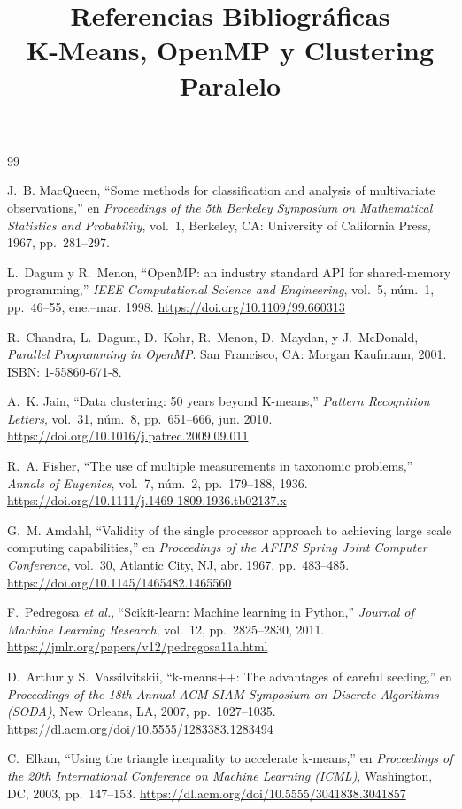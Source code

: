 \documentclass[12pt]{article}
\title{Referencias Bibliogr\'aficas\\
       \large K-Means, OpenMP y Clustering Paralelo}
\author{}
\date{}
\begin{document}
\maketitle

\begin{thebibliography}{99}

J.~B. MacQueen,
``Some methods for classification and analysis of multivariate observations,''
en \textit{Proceedings of the 5th Berkeley Symposium on Mathematical
Statistics and Probability}, vol.~1,
Berkeley, CA: University of California Press, 1967, pp.~281--297.

L.~Dagum y R.~Menon,
``OpenMP: an industry standard API for shared-memory programming,''
\textit{IEEE Computational Science and Engineering},
vol.~5, n\'um.~1, pp.~46--55, ene.--mar. 1998.
\url{https://doi.org/10.1109/99.660313}

R.~Chandra, L.~Dagum, D.~Kohr, R.~Menon, D.~Maydan, y J.~McDonald,
\textit{Parallel Programming in OpenMP}.
San Francisco, CA: Morgan Kaufmann, 2001.
ISBN: 1-55860-671-8.

A.~K. Jain,
``Data clustering: 50 years beyond K-means,''
\textit{Pattern Recognition Letters},
vol.~31, n\'um.~8, pp.~651--666, jun. 2010.
\url{https://doi.org/10.1016/j.patrec.2009.09.011}

R.~A. Fisher,
``The use of multiple measurements in taxonomic problems,''
\textit{Annals of Eugenics},
vol.~7, n\'um.~2, pp.~179--188, 1936.
\url{https://doi.org/10.1111/j.1469-1809.1936.tb02137.x}

G.~M. Amdahl,
``Validity of the single processor approach to achieving large scale
computing capabilities,''
en \textit{Proceedings of the AFIPS Spring Joint Computer Conference},
vol.~30, Atlantic City, NJ, abr. 1967, pp.~483--485.
\url{https://doi.org/10.1145/1465482.1465560}

F.~Pedregosa \textit{et al.},
``Scikit-learn: Machine learning in Python,''
\textit{Journal of Machine Learning Research},
vol.~12, pp.~2825--2830, 2011.
\url{https://jmlr.org/papers/v12/pedregosa11a.html}

D.~Arthur y S.~Vassilvitskii,
``k-means++: The advantages of careful seeding,''
en \textit{Proceedings of the 18th Annual ACM-SIAM Symposium on Discrete
Algorithms (SODA)},
New Orleans, LA, 2007, pp.~1027--1035.
\url{https://dl.acm.org/doi/10.5555/1283383.1283494}

C.~Elkan,
``Using the triangle inequality to accelerate k-means,''
en \textit{Proceedings of the 20th International Conference on Machine
Learning (ICML)},
Washington, DC, 2003, pp.~147--153.
\url{https://dl.acm.org/doi/10.5555/3041838.3041857}

\end{thebibliography}
\end{document}
